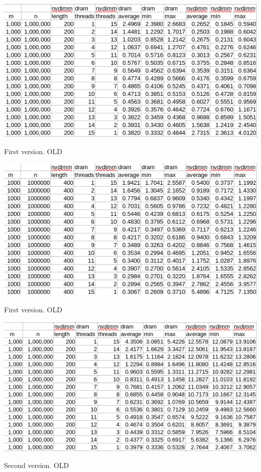 \documentclass[12pt,a4paper,USenglish]{article}      %
\begin{document}
\begin{table}[!hbtp]
\includegraphics[scale=0.7]{Large_array_test_first_version_v2.png}
\caption{First version. OLD}
\end{table}

\begin{table}[!hbtp]
\includegraphics[scale=0.7]{Large_array_test_first_version_v3.png}
\caption{First version. OLD}
\end{table}

\begin{table}[!hbtp]
\includegraphics[scale=0.7]{Large_array_test_second_version_v2.png}
\caption{Second version. OLD}
\end{table}
\end{document}
